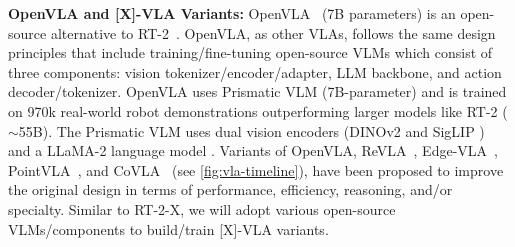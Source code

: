 \documentclass[11pt,letterpaper]{article}
\begin{document}
\begin{table}
\centering
\vspace{-2.5ex}
\caption{\scriptsize{VLMs for RT-2-[X] and [X]-VLA Variants.}}
\label{tab:VLMs}
\vspace{-2ex}
\vspace{-2ex}
\end{table}
\noindent\textbf{{} OpenVLA and [X]-VLA Variants:} 
OpenVLA~\cite{kim2024openvla} (7B parameters)
is an open-source alternative to RT-2~\cite{rt-2}. %
OpenVLA, as other VLAs, follows the same design principles that include training/fine-tuning open-source VLMs which consist of three components: vision tokenizer/encoder/adapter, LLM backbone, and action decoder/tokenizer. 
OpenVLA uses Prismatic VLM (7B-parameter) and is trained on 970k real-world robot demonstrations outperforming larger models like RT-2 ($\sim$55B). The Prismatic VLM uses dual vision encoders (DINOv2 \cite{oquab2023dinov2} and SigLIP \cite{zhai2023sigmoid}) and a LLaMA-2 language model \cite{touvron2023llama}.
Variants of OpenVLA, \eg  ReVLA~\cite{dey2024revla}, Edge-VLA~\cite{budzianowski20edgevla}, PointVLA~\cite{li2025pointvla}, and CoVLA~\cite{arai2025covla} (see \autoref{fig:vla-timeline}), have been proposed to improve the original design in terms of performance, efficiency, reasoning, and/or specialty.
Similar to RT-2-X, we will adopt various open-source VLMs/components to build/train [X]-VLA variants.
\end{document}
